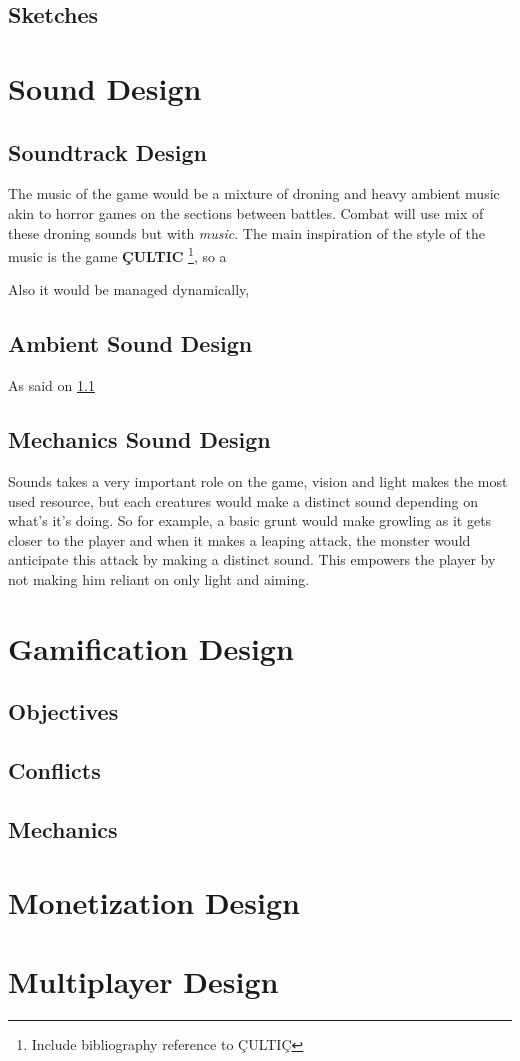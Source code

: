 \subsection{Sketches}

\section{Sound Design}
\subsection{Soundtrack Design} \label{ost}
The music of the game would be a mixture of droning and heavy ambient music akin to horror games on the sections between battles. Combat will use mix of these droning sounds but with \textit{music}.
The main inspiration of the style of the music is the game \textbf{ÇULTIC} \footnote{Include bibliography reference to ÇULTIÇ}, so a

Also it would be managed dynamically,

\subsection{Ambient Sound Design}
As said on \ref{ost}
\subsection{Mechanics Sound Design}
Sounds takes a very important role on the game, vision and light makes the most used resource, but each creatures would make a distinct sound depending on what's it's doing.
So for example, a basic grunt would make growling as it gets closer to the player and when it makes a leaping attack, the monster would anticipate this attack by making a distinct sound.
This empowers the player by not making him reliant on only light and aiming.

\section{Gamification Design}
\subsection{Objectives}
\subsection{Conflicts}
\subsection{Mechanics}

\section{Monetization Design}

\section{Multiplayer Design}


